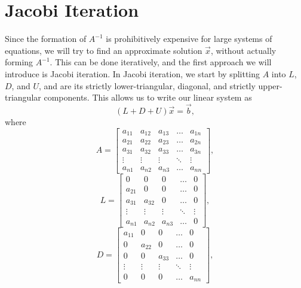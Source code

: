 \section{Jacobi Iteration}
Since the formation of $A^{-1}$ is prohibitively expensive for large systems of equations, we will try to find an approximate solution $\vec{x}$, without actually forming $A^{-1}$. This can be done iteratively, and the first approach we will introduce is Jacobi iteration. In Jacobi iteration, we start by splitting $A$ into $L$, $D$, and $U$, and are its strictly lower-triangular, diagonal, and strictly upper-triangular components. This allows us to write our linear system as
\begin{equation}
	(L+D+U) \vec{x} = \vec{b},
\end{equation}
where
\begin{equation}
	A = 
	\begin{bmatrix}
	    a_{11} & a_{12} & a_{13} & \dots  & a_{1n} \\
	    a_{21} & a_{22} & a_{23} & \dots  & a_{2n} \\
			a_{31} & a_{32} & a_{33} & \dots  & a_{3n} \\
	    \vdots & \vdots & \vdots & \ddots & \vdots \\
	    a_{n1} & a_{n2} & a_{n3} & \dots  & a_{nn}
	\end{bmatrix},
\end{equation}
\begin{equation}
	L = 
	\begin{bmatrix}
	    0 & 0 & 0 & \dots  & 0 \\
	    a_{21} & 0 & 0 & \dots  & 0 \\
			a_{31} & a_{32} & 0 & \dots  & 0 \\
	    \vdots & \vdots & \vdots & \ddots & \vdots \\
	    a_{n1} & a_{n2} & a_{n3} & \dots  & 0
	\end{bmatrix},
\end{equation}
\begin{equation}
	D = 
	\begin{bmatrix}
	    a_{11} & 0 & 0 & \dots  & 0 \\
	    0 & a_{22} & 0 & \dots  & 0 \\
			0 & 0 & a_{33} & \dots  & 0 \\
	    \vdots & \vdots & \vdots & \ddots & \vdots \\
	    0 & 0 & 0 & \dots  & a_{nn}
	\end{bmatrix},
\end{equation}
